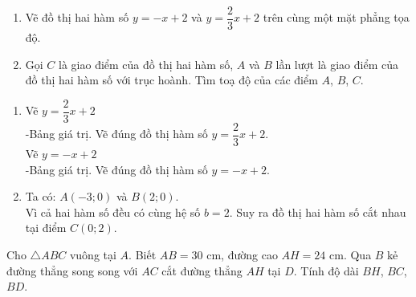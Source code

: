 \begin{ex}%
   \hfill
    \begin{enumerate}
        \item Vẽ đồ thị hai hàm số $y=- x+2$ và $y=\dfrac{2}{3}x +2$ trên cùng một mặt phẳng tọa độ.
        \item Gọi $C$ là giao điểm của đồ thị hai hàm số, $A$ và $B$ lần lượt là giao điểm của đồ thị hai hàm số với trục hoành. Tìm toạ độ của các điểm $A$, $B$, $C$.
    \end{enumerate}
\loigiai
    {
    \begin{enumerate}
        \item Vẽ $y=\dfrac{2}{3}x +2$\\
        -Bảng giá trị. Vẽ đúng đồ thị hàm số $y=\dfrac{2}{3}x +2$.\\
         Vẽ $y=-x +2$\\
        -Bảng giá trị. Vẽ đúng đồ thị hàm số $y=-x +2$.

        \item Ta có: $A\left(-3;0\right)$ và $B\left(2;0\right)$.\\
        Vì cả hai hàm số đều có cùng hệ số $b=2$.
        Suy ra  đồ thị hai hàm số cắt nhau tại điểm $C\left(0;2\right)$.
    \end{enumerate}
    }
\end{ex}
\begin{ex}%
	Cho $ \triangle ABC$ vuông tại $A$. Biết $AB = 30$ cm, đường cao $AH = 24$ cm. Qua $B$ kẻ đường thẳng song song với $AC$ cắt đường thẳng $AH$ tại $D$. Tính độ dài $BH$, $BC$, $BD$.
	\end{ex}
